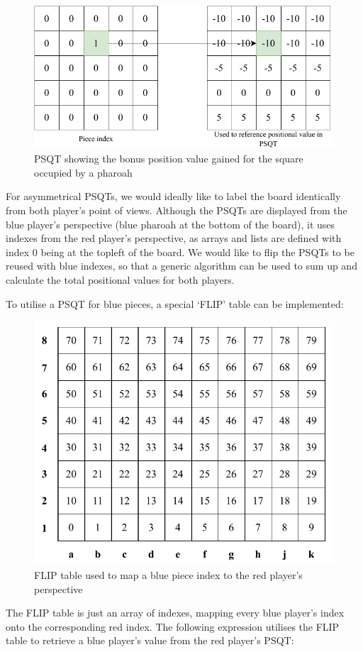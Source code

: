 \documentclass[../main/main.tex]{subfiles}
\begin{document}
\begin{figure}[H]
    \centering
    \includegraphics[width=0.8\columnwidth]{../design/assets/psqt.pdf}
    \caption{PSQT showing the bonus position value gained for the square occupied by a pharoah}
    \label{fig:psqt}
\end{figure}

For asymmetrical PSQTs, we would ideally like to label the board identically from both player’s point of views. Although the PSQTs are displayed from the blue player's perspective (blue pharoah at the bottom of the board), it uses indexes from the red player's perspective, as arrays and lists are defined with index 0 being at the topleft of the board. We would like to flip the PSQTs to be reused with blue indexes, so that a generic algorithm can be used to sum up and calculate the total positional values for both players.

To utilise a PSQT for blue pieces, a special ‘FLIP’ table can be implemented:

\begin{figure}[H]
    \centering
    \includegraphics[width=0.6\columnwidth]{../design/assets/bitboard_indexes.pdf}
    \caption{FLIP table used to map a blue piece index to the red player's perspective}
    \label{fig:flip-table}
\end{figure}

The FLIP table is just an array of indexes, mapping every blue player’s index onto the corresponding red index. The following expression utilises the FLIP table to retrieve a blue player’s value from the red player’s PSQT:
\end{document}
